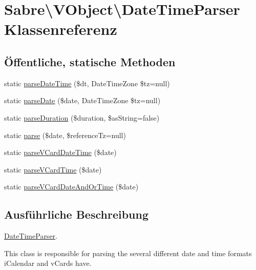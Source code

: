\hypertarget{class_sabre_1_1_v_object_1_1_date_time_parser}{}\section{Sabre\textbackslash{}V\+Object\textbackslash{}Date\+Time\+Parser Klassenreferenz}
\label{class_sabre_1_1_v_object_1_1_date_time_parser}
\subsection*{Öffentliche, statische Methoden}
\begin{DoxyCompactItemize}
\item 
static \mbox{\hyperlink{class_sabre_1_1_v_object_1_1_date_time_parser_ab10b31447333e1efb739a123192be007}{parse\+Date\+Time}} (\$dt, Date\+Time\+Zone \$tz=null)
\item 
static \mbox{\hyperlink{class_sabre_1_1_v_object_1_1_date_time_parser_adcb7e7d8e2864a53b0ec84c05c50e7d2}{parse\+Date}} (\$date, Date\+Time\+Zone \$tz=null)
\item 
static \mbox{\hyperlink{class_sabre_1_1_v_object_1_1_date_time_parser_a82605dd628113547fd15e3963df7f15c}{parse\+Duration}} (\$duration, \$as\+String=false)
\item 
static \mbox{\hyperlink{class_sabre_1_1_v_object_1_1_date_time_parser_a7d1e054afb052dc1a0e371a16bbdaf87}{parse}} (\$date, \$reference\+Tz=null)
\item 
static \mbox{\hyperlink{class_sabre_1_1_v_object_1_1_date_time_parser_a0700bbb6a7298fe08e999b9948fb0e16}{parse\+V\+Card\+Date\+Time}} (\$date)
\item 
static \mbox{\hyperlink{class_sabre_1_1_v_object_1_1_date_time_parser_ab54a3f395455e9bb9b4ab1487a8b06e5}{parse\+V\+Card\+Time}} (\$date)
\item 
static \mbox{\hyperlink{class_sabre_1_1_v_object_1_1_date_time_parser_a148b5f57f80dbe7fd35b088b0ba479d9}{parse\+V\+Card\+Date\+And\+Or\+Time}} (\$date)
\end{DoxyCompactItemize}


\subsection{Ausführliche Beschreibung}
\mbox{\hyperlink{class_sabre_1_1_v_object_1_1_date_time_parser}{Date\+Time\+Parser}}.

This class is responsible for parsing the several different date and time formats i\+Calendar and v\+Cards have.

